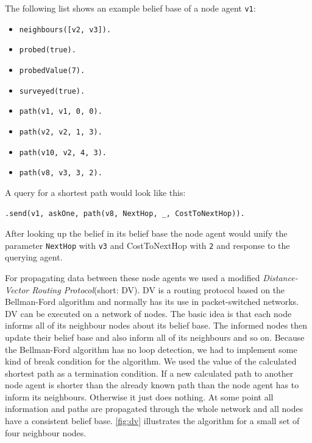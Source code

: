 \begin{samepage}
The following list shows an example belief base of a node agent \texttt{v1}:
\begin{itemize}
  \item \texttt{neighbours([v2, v3]).}
  \item \texttt{probed(true).}
  \item \texttt{probedValue(7).}
  \item \texttt{surveyed(true).}
  \item \texttt{path(v1, v1, 0, 0).}
  \item \texttt{path(v2, v2, 1, 3).}
  \item \texttt{path(v10, v2, 4, 3).}
  \item \texttt{path(v8, v3, 3, 2).}
\end{itemize}
\end{samepage}

A query for a shortest path would look like this:
\begin{lstlisting}[caption={Query for shortest path from \texttt{v1} to \texttt{v8}}, label={lst:dv_shortestPath_query}]
  .send(v1, askOne, path(v8, NextHop, _, CostToNextHop)).
\end{lstlisting}
After looking up the belief in its belief base the node agent would unify the parameter \texttt{NextHop} with \texttt{v3} and CostToNextHop with \texttt{2} and response to the querying agent.

For propagating data between these node agents we used a modified \emph{Distance-Vector Routing Protocol}(short: DV). DV is a routing protocol based on the Bellman-Ford algorithm and normally has its use in packet-switched networks. DV can be executed on a network of nodes. The basic idea is that each node informs all of its neighbour nodes about its belief base. The informed nodes then update their belief base and also inform all of its neighbours and so on. Because the Bellman-Ford algorithm has no loop detection, we had to implement some kind of break condition for the algorithm. We used the value of the calculated shortest path as a termination condition. If a new calculated path to another node agent is shorter than the already known path than the node agent has to inform its neighbours. Otherwise it just does nothing. At some point all information and paths are propagated through the whole network and all nodes have a consistent belief base. \autoref{fig:dv} illustrates the algorithm for a small set of four neighbour nodes.

